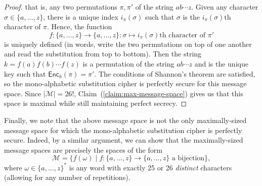 \documentclass[12pt]{article}
\numberwithin{equation}{section}
\theoremstyle{plain}
\newcommand{\set}[1]{\{ #1 \}}
\newcommand{\ptexts}{\mathcal{M}}
\newcommand{\algo}[1]{\mathsf{#1}}
\newcommand{\enc}{\algo{Enc}}
\begin{document}
\begin{enumerate}
\begin{proof}
    that is,
    any two permutations $\pi, \pi'$
    of the string $ab\cdots z$.
    Given any character $\sigma \in \set{ a, \ldots, z }$,
    there is a unique index $i_{\pi}(\sigma)$
    such that $\sigma$ is the $i_{\pi}(\sigma)$th character of $\pi$.
    Hence, the function
    \begin{equation*}
        f : \set{a,\ldots,z} \to \set{a,\ldots,z}
          : \sigma \mapsto i_{\pi}(\sigma)\text{th character of }\pi'
    \end{equation*}
    is uniquely defined
    (in words, write the two permutations on top of one another and read the substitution from top to bottom).
    Then the string $k = f(a)f(b)\cdots f(z)$
    is a permutation of the string $ab\cdots z$
    and is the unique key such that $\enc_k(\pi) = \pi'$.
    The conditions of Shannon's theorem are satisfied,
    so the mono-alphabetic substitution cipher is perfectly secure for this message space.
    Since $|\ptexts| = 26!$, Claim~(\ref{claim:max-message-space}) gives us
    that this space is maximal while still maintaining perfect secrecy.
    \end{proof}

    Finally, we note that the above message space is not the only maximally-sized message
    space for which the mono-alphabetic substitution cipher is perfectly secure.
    Indeed, by a similar argument, we can show that the maximally-sized message spaces
    are precisely the spaces of the form
    \begin{equation*}
        \ptexts = \set{ f(\omega) \mid f :\set{ a, \ldots, z } \to \set{ a, \ldots, z } \text{ a bijection} },
    \end{equation*}
    where $\omega \in \set{ a, \ldots, z }^*$ is any word with exactly 25 or 26 \emph{distinct} characters
    (allowing for any number of repetitions).
\end{enumerate}
\end{document}
